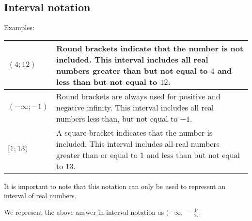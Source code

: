 \subsection*{Interval notation}
Examples:
\\
\begin{table}[H]
\begin{tabular}{|p{5cm}|p{8cm}|}
\hline
  $(4;12)$ &  Round brackets indicate that the number is not included. This interval includes all real numbers greater than but not equal to $4$ and less than but not equal to $12$.
\\ \hline
 $(- \infty; -1)$ & Round brackets are always used for positive and negative infinity. This interval includes all real numbers less than, but not equal to $-1$.
\\ \hline
 $[1; 13)$ & A square bracket indicates that the number is included. This interval includes all real numbers greater than or equal to $1$ and less than but not equal to $13$.
\\ \hline
\end{tabular}
\end{table}

It is important to note that this notation can only be used to represent an interval of real numbers. 

\par 
We represent the above answer in interval notation as $(-\infty;~-\frac{1}{2}]$.



